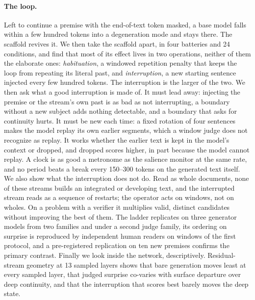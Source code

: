 \paragraph{The loop.} Left to continue a premise with the end-of-text token
masked, a base model falls within a few hundred tokens into a degeneration
mode and stays there. The scaffold revives it. We then take the scaffold
apart, in four batteries and 24 conditions, and find that most of its effect
lives in two operations, neither of them the elaborate ones:
\emph{habituation}, a windowed repetition penalty that keeps the loop from
repeating its literal past, and \emph{interruption}, a new starting
sentence injected every few hundred tokens. The interruption is the larger
of the two. We then ask what a good interruption is made of. It must lead
away: injecting the premise or the stream's own past is as bad as not
interrupting, a boundary without a new subject adds nothing detectable, and
a boundary that asks for continuity hurts. It must be new each time: a fixed
rotation of four sentences makes the model replay its own earlier segments,
which a window judge does not recognize as replay. It works whether the
earlier text is kept in the model's context or dropped, and dropped scores
higher, in part because the model cannot replay. A clock is as good a metronome as the
salience monitor at the same rate, and no period beats a break every
150--300 tokens on the generated text itself. We also show what the
interruption does not do. Read as whole documents, none of these streams
builds an integrated or developing text, and the interrupted stream reads as
a sequence of restarts; the operator acts on windows, not on wholes. On a
problem with a verifier it multiplies valid, distinct candidates without
improving the best of them. The ladder replicates on three generator models
from two families and under a second judge family, its ordering on surprise
is reproduced by independent human readers on windows of the first protocol,
and a pre-registered replication on ten new premises confirms the primary
contrast. Finally we look inside the
network, descriptively. Residual-stream geometry at 13 sampled layers shows
that bare generation moves least at every sampled layer, that judged
surprise co-varies with surface departure over deep continuity, and that
the interruption that scores best barely moves the deep state.

